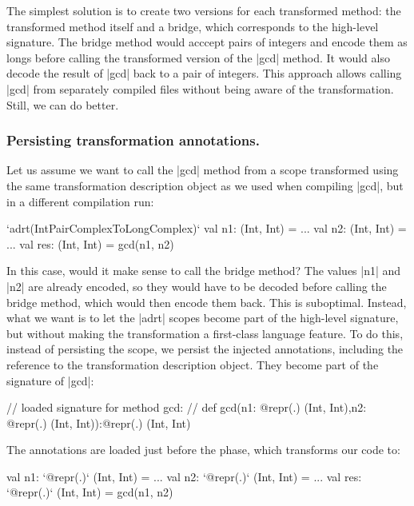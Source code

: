 The simplest solution is to create two versions for each transformed method: the transformed method itself and a bridge, which corresponds to the high-level signature. The bridge method would acccept pairs of integers and encode them as longs before calling the transformed version of the |gcd| method. It would also decode the result of |gcd| back to a pair of integers. This approach allows calling |gcd| from separately compiled files without being aware of the transformation. Still, we can do better.

\subsubsection{Persisting transformation annotations.} Let us assume we want to call the |gcd| method from a scope transformed using the same transformation description object as we used when compiling |gcd|, but in a different compilation run:

\begin{lstlisting-nobreak}
`adrt(IntPairComplexToLongComplex)` {
  val n1: (Int, Int) = ...
  val n2: (Int, Int) = ...
  val res: (Int, Int) = gcd(n1, n2)
}
\end{lstlisting-nobreak}

In this case, would it make sense to call the bridge method? The values |n1| and |n2| are already encoded, so they would have to be decoded before calling the bridge method, which would then encode them back. This is suboptimal. Instead, what we want is to let the |adrt| scopes become part of the high-level signature, but without making the transformation a first-class language feature. To do this, instead of persisting the scope, we persist the injected annotations, including the reference to the transformation description object. They become part of the signature of |gcd|:

\begin{lstlisting-nobreak}
// loaded signature for method gcd:
// def gcd(n1: @repr(.) (Int, Int),n2: @repr(.) (Int, Int)):@repr(.) (Int, Int)
\end{lstlisting-nobreak}

The annotations are loaded just before the \inject{} phase, which transforms our code to:

\begin{lstlisting-nobreak}
val n1: `@repr(.)` (Int, Int) = ...
val n2: `@repr(.)` (Int, Int) = ...
val res: `@repr(.)` (Int, Int) = gcd(n1, n2)
\end{lstlisting-nobreak}

